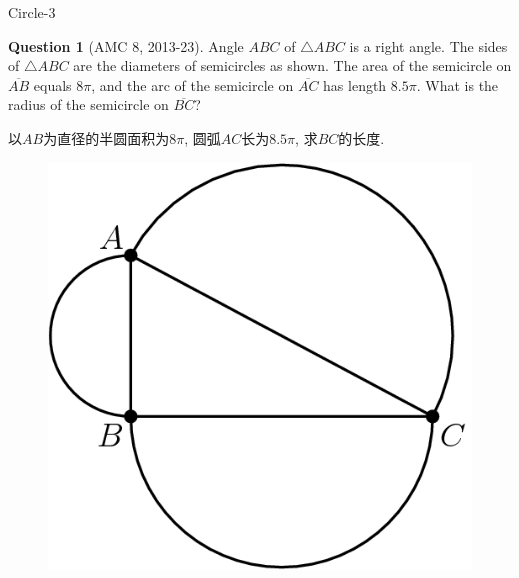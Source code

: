 \documentclass{beamer}
\theoremstyle{definition}
\newtheorem{ques}[defn]{Question}
\begin{document}
\begin{frame}{Circle-3}
    \begin{ques}[AMC 8, 2013-23]
        Angle $ABC$ of $\triangle ABC$ is a right angle. The sides of $\triangle ABC$ are the diameters of semicircles as shown. The area of the semicircle on $\overline{AB}$ equals $8\pi$, and the arc of the semicircle on $\overline{AC}$ has length $8.5\pi$. What is the radius of the semicircle on $\overline{BC}$?

        以$AB$为直径的半圆面积为$8\pi$, 圆弧$AC$长为$8.5\pi$, 求$BC$的长度.
    \end{ques}
    \begin{figure}
        \includegraphics[height=0.4\textheight]{circle4.png}
    \end{figure}
\end{frame}
\end{document}
